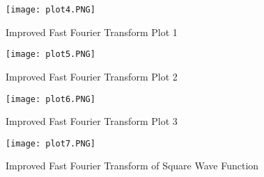 \begin{figure}[H]
    \centering
    \texttt{[image: plot4.PNG]}
   	\caption{Improved Fast Fourier Transform Plot 1}
\end{figure} 

\begin{figure}[H]
    \centering
    \texttt{[image: plot5.PNG]}
   	\caption{Improved Fast Fourier Transform Plot 2}
\end{figure} 

\begin{figure}[H]
    \centering
    \texttt{[image: plot6.PNG]}
   	\caption{Improved Fast Fourier Transform Plot 3}
\end{figure}  

\begin{figure}[H]
    \centering
    \texttt{[image: plot7.PNG]}
   	\caption{Improved Fast Fourier Transform of Square Wave Function}
\end{figure} 



